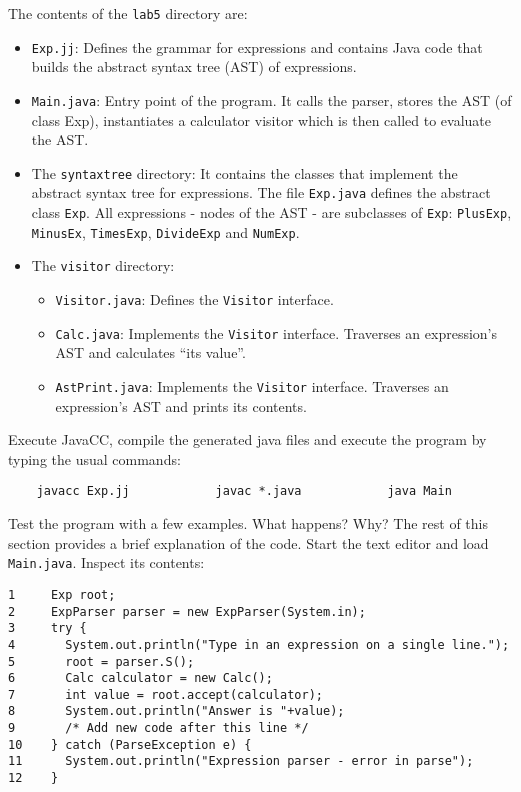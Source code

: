 \documentclass{article}
\begin{document}
The contents of the {\tt lab5} directory are:
\begin{itemize}
\item {\tt Exp.jj}: Defines the grammar for expressions and contains Java code that builds the abstract syntax tree (AST) of expressions.
\item {\tt Main.java}: Entry point of the program. It calls the parser, stores the AST (of class Exp), instantiates a calculator visitor which is then called to evaluate the AST.
\item The {\tt syntaxtree} directory: It contains the classes that implement the abstract syntax tree for expressions. The file {\tt Exp.java} defines the abstract class {\tt Exp}. All expressions - nodes of the AST - are subclasses of {\tt Exp}: {\tt PlusExp}, {\tt MinusEx}, {\tt TimesExp}, {\tt DivideExp} and {\tt NumExp}.
\item The {\tt visitor} directory:
\begin{itemize}
\item {\tt Visitor.java}: Defines the {\tt Visitor} interface.
\item {\tt Calc.java}: Implements the {\tt Visitor} interface. Traverses an expression's AST and calculates ``its value''.
\item {\tt AstPrint.java}: Implements the {\tt Visitor} interface. Traverses an expression's  AST and prints its contents.
\end{itemize}
\end{itemize}


Execute JavaCC, compile the generated java files and execute the program by typing the usual commands:

\begin{verbatim}
    javacc Exp.jj            javac *.java            java Main
\end{verbatim}

\noindent Test the program with a few examples. What happens? Why? The rest of this section provides a brief explanation of the code.
Start the text editor and load {\tt Main.java}. Inspect its contents: 

\begin{verbatim}
1     Exp root;
2     ExpParser parser = new ExpParser(System.in);
3     try {
4       System.out.println("Type in an expression on a single line.");
5       root = parser.S();                          
6       Calc calculator = new Calc();
7       int value = root.accept(calculator);        
8       System.out.println("Answer is "+value);
9       /* Add new code after this line */
10    } catch (ParseException e) {
11      System.out.println("Expression parser - error in parse");
12    }
\end{verbatim}
\end{document}
